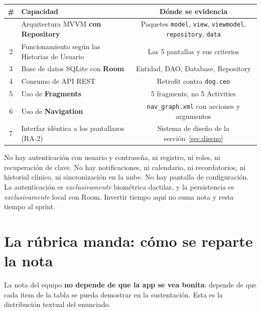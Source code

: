 \documentclass[11pt,letterpaper]{article}
\newcommand{\code}[1]{\texttt{\small #1}}
\begin{document}
\begin{center}
\begin{xltabular}{\linewidth}{@{}c X c@{}}
\toprule
\textbf{\#} & \textbf{Capacidad} & \textbf{D\'onde se evidencia}\\
\midrule
\endhead
\bottomrule
{} & Arquitectura MVVM \textbf{con Repository} & Paquetes \code{model}, \code{view}, \code{viewmodel}, \code{repository}, \code{data}\\
2 & Funcionamiento seg\'un las Historias de Usuario & Las 5 pantallas y sus criterios\\
3 & Base de datos SQLite con \textbf{Room} & Entidad, DAO, Database, Repository\\
4 & Consumo de API REST & Retrofit contra \code{dog.ceo}\\
5 & Uso de \textbf{Fragments} & 5 fragments, no 5 Activities\\
6 & Uso de \textbf{Navigation} & \code{nav\_graph.\allowbreak{}xml} con acciones y argumentos\\
7 & Interfaz id\'entica a los pantallazos (RA-2) & Sistema de dise\~no de la secci\'on~\ref{sec:diseno}\\
\end{xltabular}
\end{center}

\begin{notabox}
No hay autenticaci\'on con usuario y contrase\~na, ni registro, ni roles, ni
recuperaci\'on de clave. No hay notificaciones, ni calendario, ni recordatorios,
ni historial cl\'inico, ni sincronizaci\'on en la nube. No hay pantalla de
configuraci\'on. La autenticaci\'on es \emph{exclusivamente} biom\'etrica
dactilar, y la persistencia es \emph{exclusivamente} local con Room.
Invertir tiempo aqu\'i no suma nota y resta tiempo al sprint.
\end{notabox}

\section{La r\'ubrica manda: c\'omo se reparte la nota}
\label{sec:rubrica}

La nota del equipo \textbf{no depende de que la app se vea bonita}: depende de
que cada item de la tabla se pueda demostrar en la sustentaci\'on. Esta es la
distribuci\'on textual del enunciado.
\end{document}
